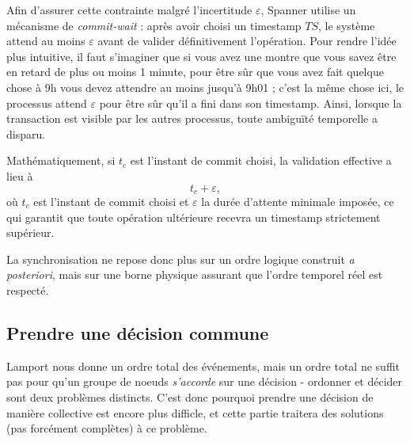 \documentclass[12pt,a4paper]{article}
\begin{document}
Afin d'assurer cette contrainte malgré l'incertitude $\varepsilon$, Spanner utilise un mécanisme de \textit{commit-wait} : après avoir choisi un timestamp $TS$, le système attend au moins $\varepsilon$ avant de valider définitivement l'opération. Pour rendre l'idée plus intuitive, il faut s'imaginer que si vous avez une montre que vous savez être en retard de plus ou moins 1 minute, pour être sûr que vous avez fait quelque chose à 9h vous devez attendre au moins jusqu'à 9h01 ; c'est la même chose ici, le processus attend $\varepsilon$ pour être sûr qu'il a fini dans son timestamp. Ainsi, lorsque la transaction est visible par les autres processus, toute ambiguïté temporelle a disparu.

Mathématiquement, si $t_c$ est l'instant de commit choisi, la validation effective a lieu à
\[
t_c + \varepsilon,
\]
où $t_c$ est l'instant de commit choisi et $\varepsilon$ la durée d'attente minimale imposée, ce qui garantit que toute opération ultérieure recevra un timestamp strictement supérieur.

La synchronisation ne repose donc plus sur un ordre logique construit \textit{a posteriori}, mais sur une borne physique assurant que l'ordre temporel réel est respecté.







%
\subsection{Prendre une décision commune}
Lamport nous donne un ordre total des événements, mais un ordre total ne suffit pas pour qu'un groupe de noeuds \textit{s'accorde} sur une décision - ordonner et décider sont deux problèmes distincts. C'est donc pourquoi prendre une décision de manière collective est encore plus difficle, et cette partie traitera des solutions (pas forcément complètes) à ce problème.
\end{document}
